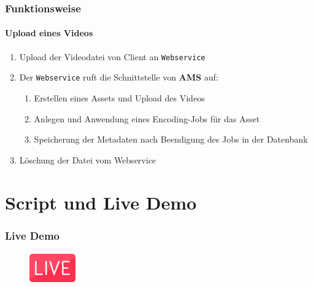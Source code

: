 \documentclass[aspectratio=169]{beamer}
\begin{document}
\begin{frame}
  \frametitle{Funktionsweise}
  \framesubtitle{Upload eines Videos}
  \begin{enumerate}
    \item Upload der Videodatei  von Client an \texttt{Webservice}
    \item Der \texttt{Webservice} ruft die Schnittstelle von \textbf{AMS} auf:
    \begin{enumerate}
      \item Erstellen eines Assets und Upload des Videos
      \item Anlegen und Anwendung eines Encoding-Jobs für das Asset
      \item Speicherung der Metadaten nach Beendigung des Jobs in der Datenbank
    \end{enumerate}
    \item Löschung der Datei vom Webservice
  \end{enumerate}
\end{frame}

\section{Script und Live Demo}
\begin{frame}
  \frametitle{Live Demo}
  \centering
  \begin{figure}[H]
    \includegraphics[height=50px, width=75px]{img/live.png}
    \label{fig:live}
  \end{figure}
\end{frame}
\end{document}
